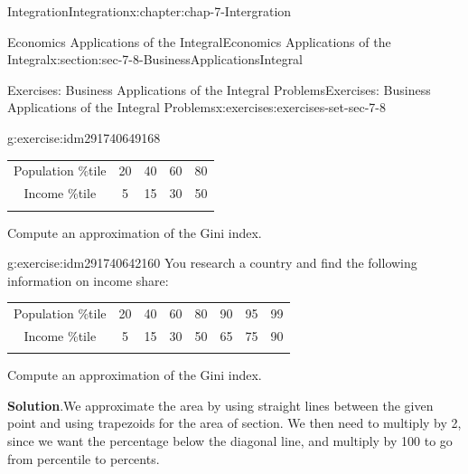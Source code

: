 \documentclass[oneside,10pt,]{book}
\newcommand{\tabularfont}{\relax}
\numberwithin{equation}{section}
\newcommand{\hrulethin}  {\noalign{\hrule height 0.04em}}
\newcommand{\hrulemedium}{\noalign{\hrule height 0.07em}}
\newcommand{\hrulethick} {\noalign{\hrule height 0.11em}}
\begin{document}
\begin{chapterptx}{Integration}{}{Integration}{}{}{x:chapter:chap-7-Intergration}
\begin{sectionptx}{Economics Applications of the Integral}{}{Economics Applications of the Integral}{}{}{x:section:sec-7-8-BusinessApplicationsIntegral}
\begin{exercises-subsection}{Exercises: Business Applications of the Integral Problems}{}{Exercises: Business Applications of the Integral Problems}{}{}{x:exercises:exercises-set-sec-7-8}
\begin{divisionexercise}{12}{}{}{g:exercise:idm291740649168}
\begin{sidebyside}{1}{0}{0}{0}
\begin{sbspanel}{1}
{\centering%
{\tabularfont%
\begin{tabular}{ccccc}\hrulethick
Population \%tile&20&40&60&80\tabularnewline\hrulethin
Income \%tile&5&15&30&50\tabularnewline\hrulemedium
\end{tabular}
}%
\par}
\end{sbspanel}%
\end{sidebyside}%
\par
Compute an approximation of the Gini index.%
\end{divisionexercise}%
\begin{divisionexercise}{13}{}{}{g:exercise:idm291740642160}%
You research a country and find the following information on income share:%
\begin{sidebyside}{1}{0}{0}{0}%
\begin{sbspanel}{1}%
{\centering%
{\tabularfont%
\begin{tabular}{cccccccc}\hrulethick
Population \%tile&20&40&60&80&90&95&99\tabularnewline\hrulethin
Income \%tile&5&15&30&50&65&75&90\tabularnewline\hrulemedium
\end{tabular}
}%
\par}
\end{sbspanel}%
\end{sidebyside}%
\par
Compute an approximation of the Gini index.%
\par\smallskip%
\noindent\textbf{Solution}.\hypertarget{g:solution:idm291740633232}{}\quad{}We approximate the area by using straight lines between the given point and using trapezoids for the area of section.  We then need to multiply by 2, since we want the percentage below the diagonal line, and multiply by 100 to go from percentile to percents.%
\begin{sidebyside}{1}{0.2}{0.2}{0}%
\begin{sbspanel}{0.6}%

\end{sbspanel}
\end{sidebyside}
\end{divisionexercise}
\end{exercises-subsection}
\end{sectionptx}
\end{chapterptx}
\end{document}
